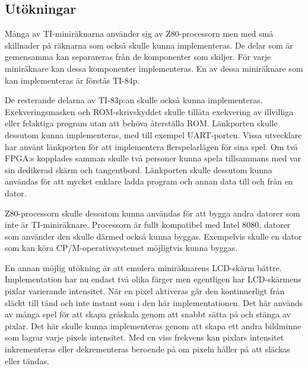 \documentclass[main.tex]{subfiles}
\begin{document}
\subsection{Utökningar}
Många av TI-miniräknarna använder sig av Z80-processorn men med små skillnader
på räknarna som också skulle kunna implementeras. De delar som är gemensamma
kan separareras från de komponenter som skiljer. För varje miniräknare kan
dessa komponenter implementeras. En av dessa miniräknare som kan implementeras
är förstås TI-84p.

De resterande delarna av TI-83p:an skulle också kunna implementeras.
Exekveringsmasken och ROM-skrivskyddet skulle tillåta exekvering av illvilliga
eller felaktiga program utan att behöva återställa ROM. Länkporten skulle
dessutom kunna implementeras, med till exempel UART-porten. Vissa utvecklare
har använt länkporten för att implementera flerspelarlägen för sina spel. Om
två FPGA:s kopplades samman skulle två personer kunna spela tillsammans med var
sin dedikerad skärm och tangentbord. Länkporten skulle dessutom kunna användas
för att mycket enklare ladda program och annan data till och från en dator.

Z80-processorn skulle dessutom kunna användas för att bygga andra datorer som
inte är TI-miniräknare. Processorn är fullt kompatibel med Intel 8080, datorer
som använder den skulle därmed också kunna byggas. Exempelvis skulle en dator
som kan köra CP/M-operativsystemet möjligtvis kunna byggas.

En annan möjlig utökning är att emulera miniräknarens LCD-skärm bättre.
Implementation har nu endast två olika färger men egentligen har LCD-skärmens
pixlar varierande intensitet. När en pixel aktiveras går den kontinuerligt från
släckt till tänd och inte instant som i den här implementationen. Det här
används av många spel för att skapa gråskala genom att snabbt sätta på och
stänga av pixlar. Det här skulle kunna implementeras genom att skapa ett andra
bildminne som lagrar varje pixels intensitet. Med en viss frekvens kan pixlars
intensitet inkrementeras eller dekrementeras beroende på om pixeln håller på
att släckas eller tändas.
\end{document}
